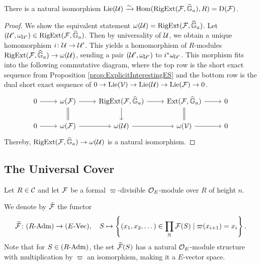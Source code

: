 \documentclass[../main.tex]{subfiles}
\begin{document}
\begin{lem}\label{lem:LieAlgOfUnivAddExt}
  There is a natural isomorphism $\operatorname{Lie}(\mathcal{U}) \xrightarrow{\sim} \operatorname{Hom}(\operatorname {RigExt}(\mathcal{F}, \widehat{\mathbb{G}}_a), R) 
  = \mathrm{D}(\mathcal{F})$.
\begin{proof}
  We show the equivalent statement $\omega(\mathcal{U}) = \operatorname {RigExt}(\mathcal{F}, \widehat{\mathbb{G}}_a)$. 
  Let $(\mathcal{U}', \omega_{\mathcal{U}'}) \in \operatorname {RigExt}(\mathcal{F}, \widehat{\mathbb{G}}_a)$. Then by universality of 
  $\mathcal{U}$, we obtain a unique homomorphism $i\colon  \mathcal{U} \to \mathcal{U}'$. This yields a 
  homomorphism of $R$-modules $\operatorname {RigExt}(\mathcal{F}, \widehat{\mathbb{G}}_a) \to \omega(\mathcal{U})$, 
  sending a pair $(\mathcal{U}', \omega_{\mathcal{U}'})$ to $i^*\omega_{\mathcal{U}'}$. This morphism
  fits into the following commutative diagram, where the top row is 
  the short exact sequence from Proposition \ref{prop:ExplicitInterestingES}
  and the bottom row is the dual short exact sequence of 
  $0 \to \operatorname{Lie}(\mathcal{V}) \to \operatorname{Lie}(\mathcal{U}) \to \operatorname{Lie}(\mathcal{F}) \to 0$.
  \begin{equation*}
  \begin{tikzcd}[ampersand replacement=\&]
  	0 \& {\omega(\cF)} \& {\RigExt(\cF, \Ghat_a)} \& {\Ext(\cF, \Ghat_a)} \& 0 \\
  	0 \& {\omega(\cF)} \& {\omega(\cU)} \& {\omega(\cV)} \& 0
  	\arrow[from=1-1, to=1-2]
  	\arrow[from=1-2, to=1-3]
  	\arrow[Rightarrow, no head, from=1-2, to=2-2]
  	\arrow[from=1-3, to=1-4]
  	\arrow[from=1-3, to=2-3]
  	\arrow[from=1-4, to=1-5]
  	\arrow[Rightarrow, no head, from=1-4, to=2-4]
  	\arrow[from=2-1, to=2-2]
  	\arrow[from=2-2, to=2-3]
  	\arrow[from=2-3, to=2-4]
  	\arrow[from=2-4, to=2-5]
  \end{tikzcd}
  \end{equation*}
  Thereby, $\operatorname {RigExt}(\mathcal{F}, \widehat{\mathbb{G}}_a) \to \omega(\mathcal{U})$ is a natural isomorphism.
\end{proof}
\end{lem}

\subsection{The Universal Cover} %
\label{sub:Tate Modules and the Universal Cover} 

Let $R \in \mathcal{C}$ and let $\mathcal{F}$ be a formal
$\varpi$-divisible ${\mathcal{O}_E}$-module over $R$ of height $n$. 
\begin{defi}
  We denote by $\tilde {\mathcal{F}}$ the functor
  \begin{equation*}
    \widetilde{\mathcal{F}} \colon {({R}\textnormal-\allowbreak\mathrm{Adm})} \to {({E}\textnormal-\allowbreak\mathrm{Vec})}, \quad
    S \mapsto \left\{(x_1, x_2, \dots) \in \prod_{\mathbb{N}} \mathcal{F}(S) \mid \varpi (x_{i+1}) =
    x_i \right\}.
  \end{equation*}
  Note that for $S \in {({R}\textnormal-\allowbreak\mathrm{Adm})}$, the set $\widetilde{\mathcal{F}}(S)$ has a natural
  ${\mathcal{O}_E}$-module structure with multiplication by $\varpi$ an isomorphism, making
  it a $E$-vector space.
\end{defi}
\end{document}

